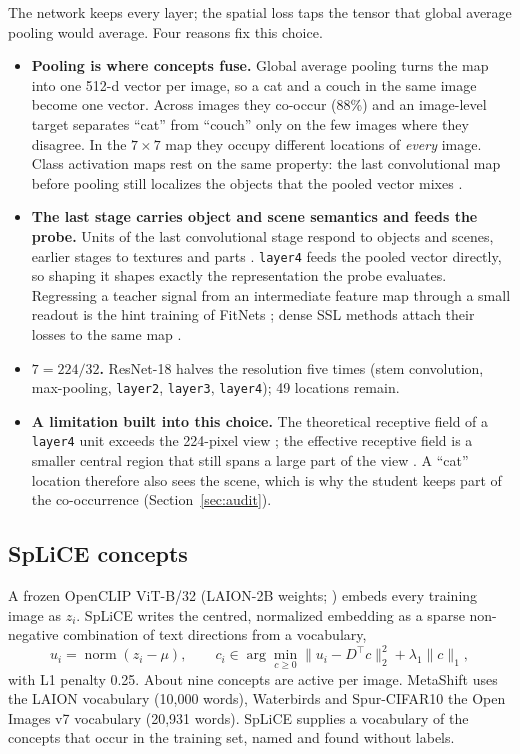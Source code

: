 \documentclass[11pt]{article}
\begin{document}
The network keeps every layer; the spatial loss taps the tensor that global average pooling would average.
Four reasons fix this choice.
\begin{itemize}[leftmargin=*]
\item \textbf{Pooling is where concepts fuse.} Global average pooling \citep{lin2014nin} turns the map into
one 512-d vector per image, so a cat and a couch in the same image become one vector. Across images they
co-occur (88\%) and an image-level target separates ``cat'' from ``couch'' only on the few images where they
disagree. In the $7\times7$ map they occupy different locations of \emph{every} image. Class activation maps
rest on the same property: the last convolutional map before pooling still localizes the objects that the
pooled vector mixes \citep{zhou2016cam}.
\item \textbf{The last stage carries object and scene semantics and feeds the probe.} Units of the last
convolutional stage respond to objects and scenes, earlier stages to textures and parts
\citep{bau2017dissection}. \texttt{layer4} feeds the pooled vector directly, so shaping it shapes exactly the
representation the probe evaluates. Regressing a teacher signal from an intermediate feature map through a
small readout is the hint training of FitNets \citep{romero2015fitnets}; dense SSL methods attach their losses
to the same map \citep{wang2021densecl,xie2021pixpro,henaff2021detcon}.
\item \textbf{$7=224/32$.} ResNet-18 halves the resolution five times (stem convolution, max-pooling,
\texttt{layer2}, \texttt{layer3}, \texttt{layer4}); 49 locations remain.
\item \textbf{A limitation built into this choice.} The theoretical receptive field of a \texttt{layer4} unit
exceeds the 224-pixel view \citep{araujo2019receptive}; the effective receptive field is a smaller central
region that still spans a large part of the view \citep{luo2016erf}. A ``cat'' location therefore also sees
the scene, which is why the student keeps part of the co-occurrence (Section~\ref{sec:audit}).
\end{itemize}

\subsection{SpLiCE concepts}
\label{sec:splice}
A frozen OpenCLIP ViT-B/32 (LAION-2B weights; \citealp{radford2021clip}) embeds every training image as $z_i$.
SpLiCE \citep{bhalla2024splice} writes the centred, normalized embedding as a sparse non-negative combination
of text directions from a vocabulary,
\begin{equation}
u_i=\operatorname{norm}(z_i-\mu),\qquad c_i\in\arg\min_{c\ge0}\|u_i-D^\top c\|_2^2+\lambda_1\|c\|_1,
\end{equation}
with L1 penalty 0.25. About nine concepts are active per image. MetaShift uses the LAION vocabulary (10,000
words), Waterbirds and Spur-CIFAR10 the Open Images v7 vocabulary (20,931 words). SpLiCE supplies a vocabulary
of the concepts that occur in the training set, named and found without labels.
\end{document}
